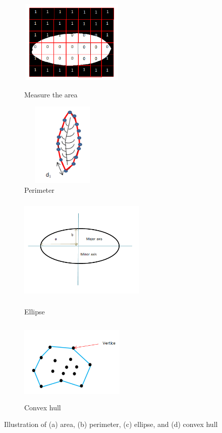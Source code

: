 \documentclass{article}
\begin{document}
\begin{figure}[!ht]
\begin{subfigure}{.5\textwidth}

\centering
        \includegraphics[width=50mm, height=40mm]{Figures/Areacal.png}
        \caption{\label{areacal}Measure the area}
        
\centering
        \includegraphics[width=40mm, height=40mm]{leaffeatures/perical.png}
        \caption{\label{calperi}Perimeter}
        
        
\end{subfigure} 
\begin{subfigure}{.5\textwidth}
\centering
        \includegraphics[width=60mm, height=50mm]{Figures/c11.png}
        \caption{\label{shape6}Ellipse}
        
\centering
        \includegraphics[width=50mm, height=40mm]{Figures/concal.png}
        \caption{\label{shconvex}Convex hull}       
        
\end{subfigure} 

\caption{Illustration of (a) area, (b) perimeter, (c) ellipse, and (d) convex hull}
        \end{figure}
\end{document}
